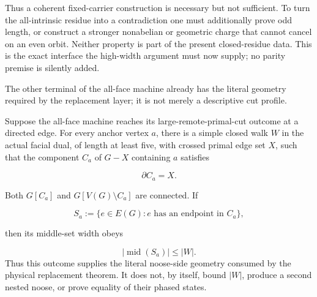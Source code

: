 Thus a coherent fixed-carrier construction is necessary but not sufficient.
To turn the all-intrinsic residue into a contradiction one must additionally
prove odd length, or construct a stronger nonabelian or geometric charge that
cannot cancel on an even orbit.  Neither property is part of the present
closed-residue data.  This is the exact interface the high-width argument must
now supply; no parity premise is silently added.

The other terminal of the all-face machine already has the literal geometry
required by the replacement layer; it is not merely a descriptive cut
profile.

\begin{lemma}
\label{lem:all-face-large-cut-literal-noose}
Suppose the all-face machine reaches its large-remote-primal-cut outcome at a
directed edge.  For every anchor vertex \(a\), there is a simple closed walk
\(W\) in the actual facial dual, of length at least five, with crossed primal
edge set \(X\), such that the component \(C_a\) of \(G-X\) containing \(a\)
satisfies

\[
  \partial C_a=X.
\]

Both \(G[C_a]\) and \(G[V(G)\setminus C_a]\) are connected.  If

\[
  S_a:=\{e\in E(G):e\text{ has an endpoint in }C_a\},
\]

then its middle-set width obeys

\[
  |\operatorname{mid}(S_a)|\le |W|.
\]
Thus this outcome supplies the literal noose-side geometry consumed by the
physical replacement theorem.  It does not, by itself, bound \(|W|\), produce
a second nested noose, or prove equality of their phased states.
\end{lemma}

